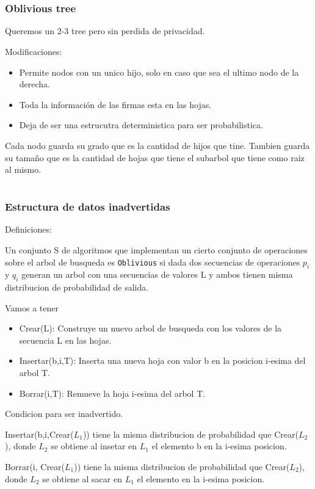 \documentclass[10pt,handout]{beamer}
\begin{document}

\section{}
\begin{frame}
\frametitle{Oblivious tree}

Queremos un 2-3 tree pero sin perdida de privacidad.

Modificaciones:
\begin{itemize}
  \item Permite nodos con un unico hijo, solo en caso que sea el ultimo nodo de la derecha.
  \item Toda la información de las firmas esta en las hojas.
  \item Deja de ser una estrucutra deterministica para ser probabilistica.
\end{itemize}

Cada nodo guarda su grado que es la cantidad de hijos que tine.
Tambien guarda su tamaño que es la cantidad de hojas que tiene el subarbol que tiene como
raiz al mismo.
\end{frame}



\section{}
\begin{frame}
\frametitle{Estructura de datos inadvertidas}

Definiciones:

Un conjunto S de algoritmos que implementan un cierto conjunto de operaciones sobre el arbol de busqueda es
\texttt{Oblivious} si dada dos secuencias de operaciones $p_i$ y $q_i$ generan un arbol con una secuencias
de valores L y ambos tienen misma distribucion de probabilidad de salida.


Vamos a tener
\begin{itemize}
  \item Crear(L): Construye un nuevo arbol de busqueda con los valores de la secuencia L en las hojas.
  \item Insertar(b,i,T): Inserta una nueva hoja con valor b en la posicion i-esima del arbol T.
  \item Borrar(i,T): Remueve la hoja i-esima del arbol T.
\end{itemize}

Condicion para ser inadvertido.

Insertar(b,i,Crear($L_1$)) tiene la misma distribucion de probabilidad que Crear($L_2$), donde $L_{2}$
se obtiene al insetar en $L_{1}$ el elemento b en la i-esima posicion.

Borrar(i, Crear($L_{1}$)) tiene la misma distribucion de probabilidad que Crear($L_2$), donde $L_{2}$
se obtiene al sacar en $L_{1}$ el elemento en la i-esima posicion.


\end{frame}
\end{document}
